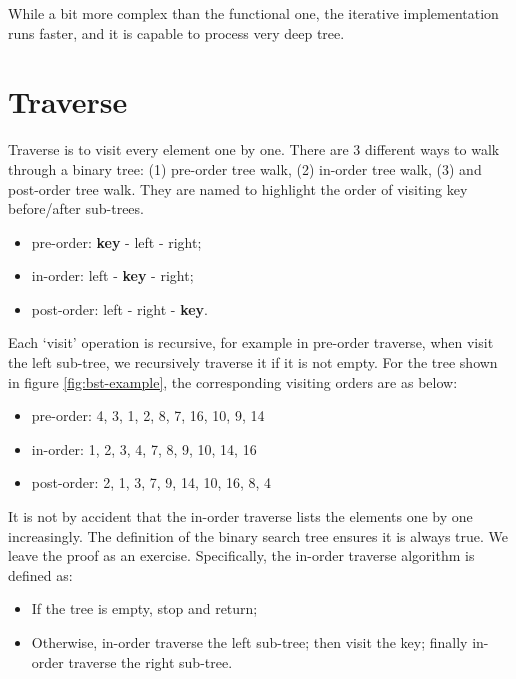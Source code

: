 \documentclass[b5paper]{article}
\begin{document}
While a bit more complex than the functional one, the iterative implementation runs faster, and it is capable to process very deep tree.

\section{Traverse}

Traverse is to visit every element one by one. There are 3 different ways to walk through a binary tree: (1) pre-order tree walk, (2) in-order tree walk, (3) and post-order tree walk. They are named to highlight the order of visiting key before/after sub-trees.

\begin{itemize}
\item pre-order: \textbf{key} - left - right;
\item in-order: left - \textbf{key} - right;
\item post-order: left - right - \textbf{key}.
\end{itemize}

  

Each `visit' operation is recursive, for example in pre-order traverse, when visit the left sub-tree, we recursively traverse it if it is not empty. For the tree shown in figure \ref{fig:bst-example}, the corresponding visiting orders are as below:

\begin{itemize}
\item pre-order: 4, 3, 1, 2, 8, 7, 16, 10, 9, 14
\item in-order: 1, 2, 3, 4, 7, 8, 9, 10, 14, 16
\item post-order: 2, 1, 3, 7, 9, 14, 10, 16, 8, 4
\end{itemize}

It is not by accident that the in-order traverse lists the elements one by one increasingly. The definition of the binary search tree ensures it is always true. We leave the proof as an exercise. Specifically, the in-order traverse algorithm is defined as:

\begin{itemize}
\item If the tree is empty, stop and return;
\item Otherwise, in-order traverse the left sub-tree; then visit the key; finally in-order traverse the right sub-tree.
\end{itemize}
\end{document}
